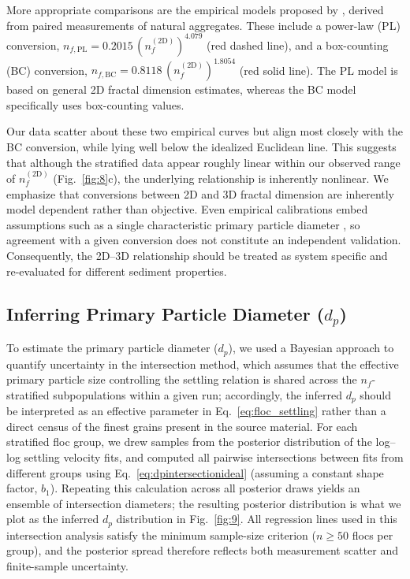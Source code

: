\documentclass{agujournal2019}
\providecommand{\DIFadd}[1]{{\protect\color{blue}#1}}
\begin{document}
More appropriate comparisons are the empirical models proposed by , derived from paired measurements of natural aggregates. These include a power-law (PL) conversion, \(n_{f,\mathrm{PL}} = 0.2015\,(n_f^{(2\mathrm{D})})^{4.079}\) (red dashed line), and a box-counting (BC) conversion, \(n_{f,\mathrm{BC}} = 0.8118\,(n_f^{(2\mathrm{D})})^{1.8054}\) (red solid line). The PL model is based on general 2D fractal dimension estimates, whereas the BC model specifically uses box-counting values.


Our data scatter about these two empirical curves but align most closely with the BC conversion, while lying well below the idealized Euclidean line. This suggests that although the stratified data appear roughly linear within our observed range of \(n_f^{(2\mathrm{D})}\) (Fig.~\ref{fig:8}c), the underlying relationship is inherently nonlinear. \DIFadd{We emphasize that conversions between 2D and 3D fractal dimension are inherently model dependent rather than objective. Even empirical calibrations embed assumptions such as a single characteristic primary particle diameter \cite{wang2022fractal}, so agreement with a given conversion does not constitute an independent validation. Consequently, the 2D--3D relationship should be treated as system specific and re-evaluated for different sediment properties.}

\subsection{Inferring Primary Particle Diameter ($d_p$)}

To estimate the primary particle diameter ($d_p$), we used a Bayesian approach to quantify uncertainty in the intersection method, \DIFadd{which assumes that the effective primary particle size controlling the settling relation is shared across the $n_f$-stratified subpopulations within a given run; accordingly, the inferred $d_p$ should be interpreted as an effective parameter in Eq.~\eqref{eq:floc_settling} rather than a direct census of the finest grains present in the source material.} For each stratified floc group, we drew samples from the posterior distribution of the log--log settling velocity fits, and computed all pairwise intersections between fits from different groups using Eq.~\eqref{eq:dpintersectionideal} (assuming a constant shape factor, $b_1$). \DIFadd{ Repeating this calculation across all posterior draws yields an ensemble of intersection diameters; the resulting posterior distribution is what we plot as the inferred $d_p$ distribution in Fig.~\ref{fig:9}. All regression lines used in this intersection analysis satisfy the minimum sample-size criterion ($n\ge50$ flocs per group), and the posterior spread therefore reflects both measurement scatter and finite-sample uncertainty.}
\end{document}
